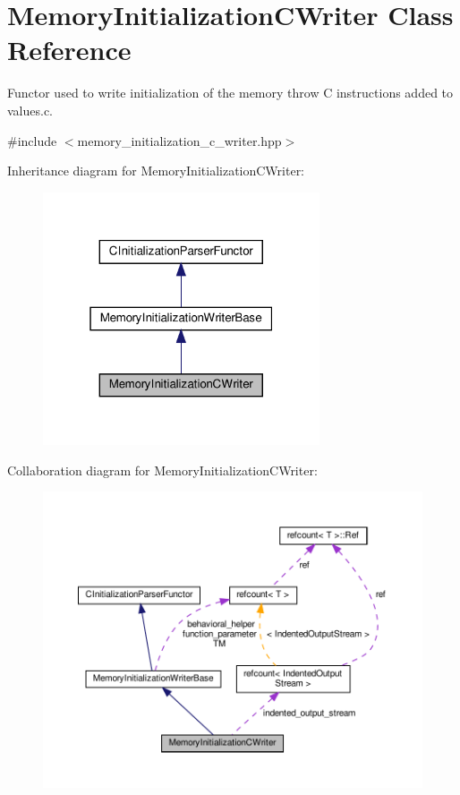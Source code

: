 \hypertarget{classMemoryInitializationCWriter}{}\section{Memory\+Initialization\+C\+Writer Class Reference}
\label{classMemoryInitializationCWriter}


Functor used to write initialization of the memory throw C instructions added to values.\+c.  




{\ttfamily \#include $<$memory\+\_\+initialization\+\_\+c\+\_\+writer.\+hpp$>$}



Inheritance diagram for Memory\+Initialization\+C\+Writer\+:
\nopagebreak
\begin{figure}[H]
\begin{center}
\leavevmode
\includegraphics[width=232pt]{d7/dbe/classMemoryInitializationCWriter__inherit__graph}
\end{center}
\end{figure}


Collaboration diagram for Memory\+Initialization\+C\+Writer\+:
\nopagebreak
\begin{figure}[H]
\begin{center}
\leavevmode
\includegraphics[width=350pt]{db/dfb/classMemoryInitializationCWriter__coll__graph}
\end{center}
\end{figure}
